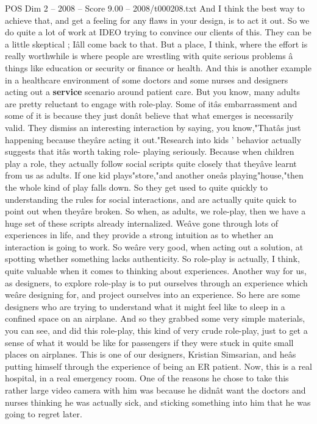 \begin{textsample}{POS Dim 2 – 2008 – Score 9.00 – 2008/t000208.txt}
And I think the best way to achieve that, and get a feeling for any flaws in your design, is to act it out.
So we do quite a lot of work at IDEO trying to convince our clients of this.
They can be a little skeptical ; Iâll come back to that.
But a place, I think, where the effort is really worthwhile is where people are wrestling with quite serious problems â things like education or security or finance or health.
And this is another example in a healthcare environment of some doctors and some nurses and designers acting out a \textbf{service} scenario around patient care.
But you know, many adults are pretty reluctant to engage with role-play.
Some of itâs embarrassment and some of it is because they just donât believe that what emerges is necessarily valid.
They dismiss an interesting interaction by saying, you know,"Thatâs just happening because theyâre acting it out."Research into kids ' behavior actually suggests that itâs worth taking role- playing seriously.
Because when children play a role, they actually follow social scripts quite closely that theyâve learnt from us as adults.
If one kid plays"store,"and another oneâs playing"house,"then the whole kind of play falls down.
So they get used to quite quickly to understanding the rules for social interactions, and are actually quite quick to point out when theyâre broken.
So when, as adults, we role-play, then we have a huge set of these scripts already internalized.
Weâve gone through lots of experiences in life, and they provide a strong intuition as to whether an interaction is going to work.
So weâre very good, when acting out a solution, at spotting whether something lacks authenticity.
So role-play is actually, I think, quite valuable when it comes to thinking about experiences.
Another way for us, as designers, to explore role-play is to put ourselves through an experience which weâre designing for, and project ourselves into an experience.
So here are some designers who are trying to understand what it might feel like to sleep in a confined space on an airplane.
And so they grabbed some very simple materials, you can see, and did this role-play, this kind of very crude role-play, just to get a sense of what it would be like for passengers if they were stuck in quite small places on airplanes.
This is one of our designers, Kristian Simsarian, and heâs putting himself through the experience of being an ER patient.
Now, this is a real hospital, in a real emergency room.
One of the reasons he chose to take this rather large video camera with him was because he didnât want the doctors and nurses thinking he was actually sick, and sticking something into him that he was going to regret later.

\end{textsample}
